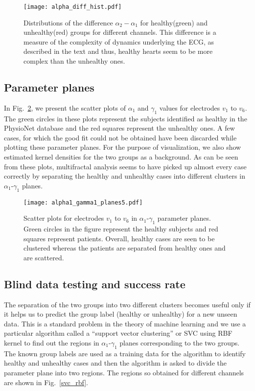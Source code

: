 \documentclass[9pt,twocolumn,twoside]{pnas-new}
\begin{document}
\begin{figure}[h]
\begin{center}
\texttt{[image: alpha\_diff\_hist.pdf]}
\caption{\label{alpha_diff_hist}  Distributions of the difference $\alpha_2-\alpha_1$ for healthy(green) and unhealthy(red) groups for different channels. This difference is a measure of the complexity of dynamics underlying the ECG, as described in the text and thus, healthy hearts seem to be more complex than the unhealthy ones.}
\end{center}
\end{figure}

\subsection{Parameter planes}
In Fig.~\ref{alpha_gamma}, we present the scatter plots of $\alpha_1$ and $\gamma_1$ values for electrodes $v_1$ to $v_6$. The green circles in these plots represent the subjects identified as healthy in the PhysioNet database and the red squares represent the unhealthy ones. A few cases, for which the good fit could not be obtained have been discarded while plotting these parameter planes. For the purpose of visualization, we also show estimated kernel densities for the two groups as a background. As can be seen from these plots, multifractal analysis seems to have picked up almost every case correctly by separating the healthy and unhealthy cases into different clusters in $\alpha_1$-$\gamma_1$ planes. 

\begin{figure}[h]
\texttt{[image: alpha1\_gamma1\_planes5.pdf]}
\caption{\label{alpha_gamma}  Scatter plots for electrodes $v_1$ to $v_6$ in $\alpha_1$-$\gamma_1$ parameter planes. Green circles in the figure represent the healthy subjects and red squares represent patients. Overall, healthy cases are seen to be clustered whereas the patients are separated from healthy ones and are scattered.}
\end{figure}

\subsection{Blind data testing and success rate}
The separation of the two groups into two different clusters becomes useful only if it helps us to predict the group label (healthy or unhealthy) for a new unseen data. This is a standard problem in the theory of machine learning and we use a particular algorithm called a ``support vector clustering'' or SVC using RBF kernel \cite{bishop2006pattern} to find out the regions in $\alpha_1$-$\gamma_1$ planes corresponding to the two groups. The known group labels are used as a training data for the algorithm to identify healthy and unhealthy cases and then the algorithm is asked to divide the parameter plane into two regions. The regions so obtained for different channels are shown in Fig.~\ref{svc_rbf}.
\end{document}
